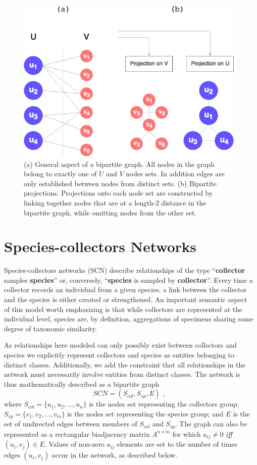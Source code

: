   \begin{figure}[h!]
  	\centering
    \includegraphics[width=0.5\linewidth]{figures/bipartite_general.png}
    \caption{(a) General aspect of a bipartite graph. All nodes in the graph belong to exactly one of $U$ and $V$ nodes sets. In addition edges are only established between nodes from distinct sets. (b) Bipartite projections. Projections onto each node set are constructed by linking together nodes that are at a length-2 distance in the bipartite graph, while omitting nodes from the other set.}
    \label{fig:bipartite_general}
  \end{figure}


\section{Species-collectors Networks}


Species-collectors networks (SCN) describe relationships of the type ``\textbf{collector} samples \textbf{species}'' or, conversely, ``\textbf{species} is sampled by \textbf{collector}''. Every time a collector records an individual from a given species, a link between the collector and the species is either created or strengthened.
An important semantic aspect of this model worth emphasizing is that while collectors are represented at the individual level, species are, by definition, aggregations of specimens sharing some degree of taxonomic similarity.

As relationships here modeled can only possibly exist between collectors and species we explicitly represent collectors and species as entities belonging to distinct classes. Additionally, we add the constraint that all relationships in the network must necessarily involve entities from distinct classes.
The network is thus mathematically described as a bipartite graph
$$ SCN = (S_{col},S_{sp},E) \mbox{ ,}$$
where $S_{col} = \{u_1, u_2, ..., u_n \}$ is the nodes set representing the collectors group; $S_{sp}=\{v_1,v_2, ..., v_m\}$ is the nodes set representing the species group; and $E$ is the set of undirected edges between members of $S_{col}$ and $S_{sp}$.
The graph can also be represented as a rectangular biadjacency matrix $A^{n\times m}$ for which $a_{ij}\neq 0$ \textit{iff} $(u_i,v_j) \in E$. Values of non-zero $a_{ij}$ elements are set to the number of times edges $(u_i,v_j)$ occur in the network, as described below.

